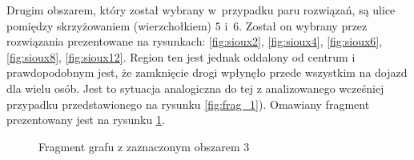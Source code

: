 \documentclass[twoside,12pt]{report}
\begin{document}
Drugim obszarem, który został wybrany w~przypadku paru rozwiązań, są ulice pomiędzy skrzyżowaniem (wierzchołkiem) $5$ i~$6$. Został on wybrany przez rozwiązania prezentowane na rysunkach: \ref{fig:sioux2}, \ref{fig:sioux4}, \ref{fig:sioux6}, \ref{fig:sioux8}, \ref{fig:sioux12}. Region ten jest jednak oddalony od centrum i prawdopodobnym jest, że zamknięcie drogi wpłynęło przede wszystkim na dojazd dla wielu osób. Jest to sytuacja analogiczna do tej z analizowanego wcześniej przypadku przedstawionego na rysunku \ref{fig:frag_1}). Omawiany fragment prezentowany jest na rysunku \ref{fig:frag_3}.

\begin{figure}[htbp]
\centering
{}
\caption{Fragment grafu z zaznaczonym obszarem 3}
\label{fig:frag_3}
\end{figure}
\end{document}
